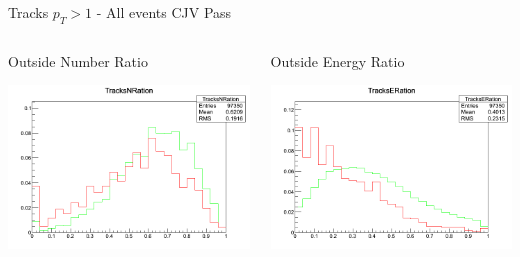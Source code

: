 \documentclass[8pt]{beamer}
\begin{document}
\begin{frame}{Tracks $p_T>1$ - All events CJV Pass}

\begin{columns}
 
\begin{block}{Outside Number Ratio}
 
\includegraphics[width=\linewidth]{img/Tracks1_CJVPass_TracksNRation.png}

\end{block}

\begin{block}{Outside Energy Ratio}
 
\includegraphics[width=\linewidth]{img/Tracks1_CJVPass_TracksERation.png}
 
\end{block}

\end{columns}

\end{frame}
\end{document}
